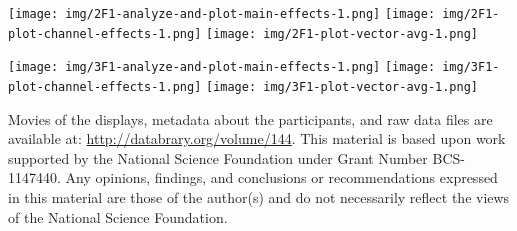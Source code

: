 \documentclass[landscape,final,paperwidth=72in,paperheight=41.5in,fontscale=0.285]{baposter}
\begin{document}
\begin{poster}
{}
{

\begin{center}

  \texttt{[image: img/2F1-analyze-and-plot-main-effects-1.png]}
  \hfill
  \texttt{[image: img/2F1-plot-channel-effects-1.png]}
  \hfill
  \texttt{[image: img/2F1-plot-vector-avg-1.png]}
  
\end{center}

}
{

\begin{center}
  \texttt{[image: img/3F1-analyze-and-plot-main-effects-1.png]}
  \hfill
  \texttt{[image: img/3F1-plot-channel-effects-1.png]}
  \hfill
  \texttt{[image: img/3F1-plot-vector-avg-1.png]}
\end{center}

}
    {
       Movies of the displays, metadata about the participants, and raw data files are available at: \url{http://databrary.org/volume/144}.
     }  
    {
    \smaller
      This material is based upon work supported by the National Science Foundation under Grant Number BCS-1147440. Any opinions, findings, and conclusions or recommendations expressed in this material are those of the author(s) and do not necessarily reflect the views of the National Science Foundation.  
    }    
  {
          \tiny
          \renewcommand{\refname}{\vspace{-0.5em}} %
%          
%          
          
          
          

}

\end{poster}%
%
\end{document}

